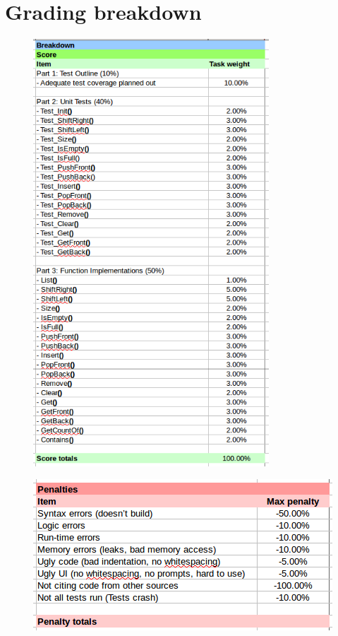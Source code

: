     

    \section{Grading breakdown}

    \begin{figure}[h]
        \centering
        \includegraphics[height=16cm]{images-2018-01/2018-01-project1-breakdown1.png}
    \end{figure}

    \begin{figure}[h]
        \centering
        \includegraphics{images-2018-01/2018-01-project1-breakdown2.png}
    \end{figure}
    

